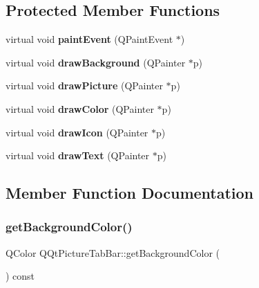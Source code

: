 \subsection*{Protected Member Functions}
\begin{DoxyCompactItemize}
\item 
\mbox{\label{class_q_qt_picture_tab_bar_a5b5811fa2ceb14c8290c8f1ba00fb498}} 
virtual void {\bfseries paint\+Event} (Q\+Paint\+Event $\ast$)
\item 
\mbox{\label{class_q_qt_picture_tab_bar_a7f30bafdbbfeba0ecf60864552fd2676}} 
virtual void {\bfseries draw\+Background} (Q\+Painter $\ast$p)
\item 
\mbox{\label{class_q_qt_picture_tab_bar_a716761f4a4b2429504e1ffdbefecae3c}} 
virtual void {\bfseries draw\+Picture} (Q\+Painter $\ast$p)
\item 
\mbox{\label{class_q_qt_picture_tab_bar_a1edc04b21445775ebf636374a5ac060e}} 
virtual void {\bfseries draw\+Color} (Q\+Painter $\ast$p)
\item 
\mbox{\label{class_q_qt_picture_tab_bar_a4f9646631867941f138662a500b0d16c}} 
virtual void {\bfseries draw\+Icon} (Q\+Painter $\ast$p)
\item 
\mbox{\label{class_q_qt_picture_tab_bar_a037d9d7521c46db264f34acef3062c33}} 
virtual void {\bfseries draw\+Text} (Q\+Painter $\ast$p)
\end{DoxyCompactItemize}


\subsection{Member Function Documentation}
\mbox{\label{class_q_qt_picture_tab_bar_a75e42ec79228e9cb7ce7bddd375b5816}} 
\subsubsection{\texorpdfstring{get\+Background\+Color()}{getBackgroundColor()}}
{\footnotesize\ttfamily Q\+Color Q\+Qt\+Picture\+Tab\+Bar\+::get\+Background\+Color (\begin{DoxyParamCaption}{ }\end{DoxyParamCaption}) const\hspace{0.3cm}{\ttfamily [inline]}}

